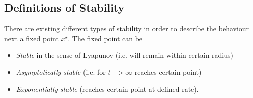 \subsection{Definitions of Stability}
There are existing different types of stability in order to describe the behaviour next a fixed point $x^{\star}$. The fixed point can be 
\begin{itemize}
\item \textit{Stable} in the sense of Lyapunov (i.e. will remain within certain radius)
\item \textit{Asymptotically stable} (i.e. for $t->\infty$ reaches certain point)
\item \textit{Exponentially stable} (reaches certain point at defined rate).
\end{itemize}
